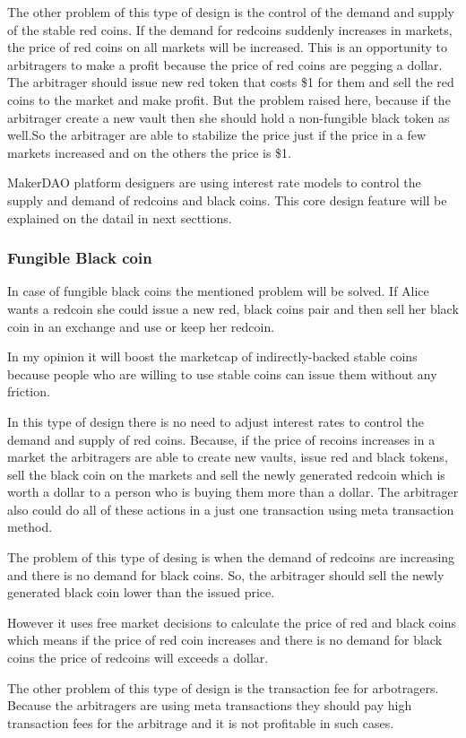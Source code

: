 The other problem of this type of design is the control of the demand and supply of the stable red coins. If the demand for redcoins suddenly increases in markets, the price of red coins on all markets will be increased. This is an opportunity to arbitragers to make a profit because the price of red coins are pegging a dollar. The arbitrager should issue new red token that costs \$1 for them and sell the red coins to the market and make profit. But the problem raised here, because if the arbitrager create a new vault then she should hold a non-fungible black token as well.So the arbitrager are able to stabilize the price just if the price in a few markets increased and on the others the price is \$1.

MakerDAO platform designers are using interest rate models to control the supply and demand of redcoins and black coins. This core design feature will be explained on the datail in next secttions.

\subsubsection{Fungible Black coin}

In case of fungible black coins the mentioned problem will be solved. If Alice wants a redcoin she could issue a new red, black coins pair and then sell her black coin in an exchange and use or keep her redcoin.

In my opinion it will boost the marketcap of indirectly-backed stable coins because people who are willing to use stable coins can issue them without any friction.

In this type of design there is no need to adjust interest rates to control the demand and supply of red coins. Because, if the price of recoins increases in a market the arbitragers are able to create new vaults, issue red and black tokens, sell the black coin on the markets and sell the newly generated redcoin which is worth a dollar to a person who is buying them more than a dollar. The arbitrager also could do all of these actions in a just one transaction using meta transaction method.

The problem of this type of desing is when the demand of redcoins are increasing and there is no demand for black coins. So, the arbitrager should sell the newly generated black coin lower than the issued price.

However it uses free market decisions to calculate the price of red and black coins which means if the price of red coin increases and there is no demand for black coins the price of redcoins will exceeds a dollar. 

The other problem of this type of design is the transaction fee for arbotragers. Because the arbitragers are using meta transactions they should pay high transaction fees for the arbitrage and it is not profitable in such cases.

